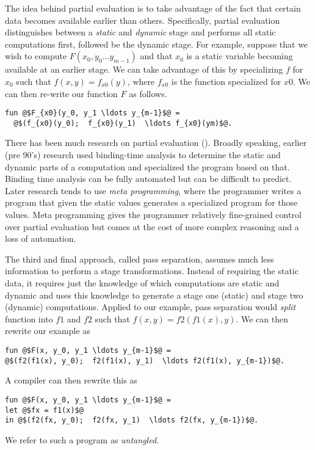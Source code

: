 The idea behind partial evaluation is to take advantage of the fact
that certain data becomes available earlier than others.
Specifically, partial evaluation distinguishes between a {\em static}
and {\em dynamic} stage and performs all static computations first,
followed be the dynamic stage.  For example, suppose that we wish to
compute $F(x_0, y_0 \ldots y_{m-1})$ and that $x_0$ is a static
variable becoming available at an earlier stage.  We can take
advantage of this by specializing $f$ for $x_0$ such that $f(x,y) =
f_{x0}(y)$, where $f_{x0}$ is the function specialized for $x0$.  We
can then re-write our function $F$ as follows.

\begin{lstlisting}
fun @$F_{x0}(y_0, y_1 \ldots y_{m-1}$@ = 
  @$(f_{x0}(y_0);  f_{x0}(y_1)  \ldots f_{x0}(ym)$@.
\end{lstlisting}


There has been much research on partial evaluation ().
Broadly speaking, earlier (pre 90's) research used binding-time
analysis to determine the static and dynamic parts of a computation
and specialized the program based on that.  Binding time analysis can
be fully automated but can be difficult to predict.  Later research
tends to use {\em meta programming}, where the programmer writes a
program that given the static values generates a specialized program
for those values.  Meta programming gives the programmer relatively
fine-grained control over partial evaluation but comes at the cost of
more complex reasoning and a loss of automation. 


The third and final approach, called pass separation, assumes much
less information to perform a stage transformations.  Instead of
requiring the static data, it requires just the knowledge of which
computations are static and dynamic and uses this knowledge to
generate a stage one (static) and stage two (dynamic) computations.
Applied to our example, pass separation would {\em split} function
into $f1$ and $f2$ such that $f(x,y) = f2(f1(x),y)$.  We can then
rewrite our example as
\begin{lstlisting}
fun @$F(x, y_0, y_1 \ldots y_{m-1}$@ = 
@$(f2(f1(x), y_0);  f2(f1(x), y_1)  \ldots f2(f1(x), y_{m-1})$@.
\end{lstlisting}
%
A compiler can then rewrite this as 
\begin{lstlisting}
fun @$F(x, y_0, y_1 \ldots y_{m-1}$@ = 
let @$fx = f1(x)$@
in @$(f2(fx, y_0);  f2(fx, y_1)  \ldots f2(fx, y_{m-1})$@.
\end{lstlisting}
We refer to such a program as {\em untangled}.

